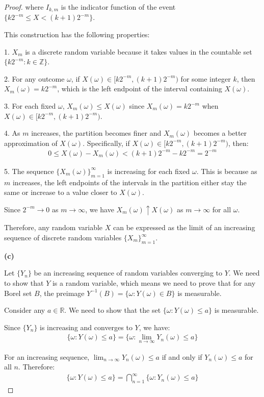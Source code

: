 \documentclass[letterpaper, 11pt]{article}
\newcommand{\1}{\mathds{1}}	%
\theoremstyle{definition}
\begin{document}
\begin{proof}
where $I_{k,m}$ is the indicator function of the event $\{k2^{-m} \leq X < (k+1)2^{-m}\}$.

This construction has the following properties:

1. $X_m$ is a discrete random variable because it takes values in the countable set $\{k2^{-m}: k \in \mathbb{Z}\}$.

2. For any outcome $\omega$, if $X(\omega) \in [k2^{-m}, (k+1)2^{-m})$ for some integer $k$, then $X_m(\omega) = k2^{-m}$, which is the left endpoint of the interval containing $X(\omega)$.

3. For each fixed $\omega$, $X_m(\omega) \leq X(\omega)$ since $X_m(\omega) = k2^{-m}$ when $X(\omega) \in [k2^{-m}, (k+1)2^{-m})$.

4. As $m$ increases, the partition becomes finer and $X_m(\omega)$ becomes a better approximation of $X(\omega)$. Specifically, if $X(\omega) \in [k2^{-m}, (k+1)2^{-m})$, then:
\begin{align}
0 \leq X(\omega) - X_m(\omega) < (k+1)2^{-m} - k2^{-m} = 2^{-m}
\end{align}

5. The sequence $\{X_m(\omega)\}_{m=1}^{\infty}$ is increasing for each fixed $\omega$. This is because as $m$ increases, the left endpoints of the intervals in the partition either stay the same or increase to a value closer to $X(\omega)$.

Since $2^{-m} \to 0$ as $m \to \infty$, we have $X_m(\omega) \uparrow X(\omega)$ as $m \to \infty$ for all $\omega$.

Therefore, any random variable $X$ can be expressed as the limit of an increasing sequence of discrete random variables $\{X_m\}_{m=1}^{\infty}$.

\textbf{(c)}

Let $\{Y_n\}$ be an increasing sequence of random variables converging to $Y$. We need to show that $Y$ is a random variable, which means we need to prove that for any Borel set $B$, the preimage $Y^{-1}(B) = \{\omega: Y(\omega) \in B\}$ is measurable.

Consider any $a \in \mathbb{R}$. We need to show that the set $\{\omega: Y(\omega) \leq a\}$ is measurable.

Since $\{Y_n\}$ is increasing and converges to $Y$, we have:
\begin{align*}
\{\omega: Y(\omega) \leq a\} = \{\omega: \lim_{n \to \infty} Y_n(\omega) \leq a\}
\end{align*}

For an increasing sequence, $\lim_{n \to \infty} Y_n(\omega) \leq a$ if and only if $Y_n(\omega) \leq a$ for all $n$. Therefore:
\begin{align*}
\{\omega: Y(\omega) \leq a\} = \bigcap_{n=1}^{\infty} \{\omega: Y_n(\omega) \leq a\}
\end{align*}


\end{proof}
\end{document}
